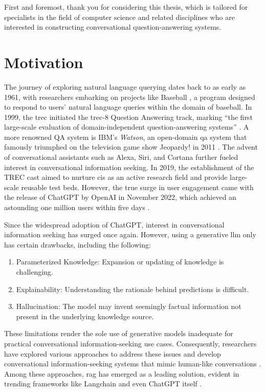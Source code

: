 First and foremost, thank you for considering this thesis, which is tailored for specialists in the field of computer science and related disciplines who are interested in constructing conversational question-answering systems.

\section{Motivation}


The journey of exploring natural language querying dates back to as early as 1961, with researchers embarking on projects like Baseball \cite{green_baseball_1961}, a program designed to respond to users' natural language queries within the domain of baseball. In 1999, the \gls{trec} initiated the \gls{trec}-8 Question Answering track, marking \enquote{the first large-scale evaluation of domain-independent question-answering systems} \cite{voorhees_trec-8_1999}. A more renowned QA system is IBM's \textit{Watson}, an open-domain \gls{qa} system that famously triumphed on the television game show Jeopardy! in 2011 \cite{ferrucci_introduction_2012}. The advent of conversational assistants such as Alexa, Siri, and Cortana further fueled interest in conversational information seeking. In 2019, the establishment of the TREC \gls{cast} aimed to nurture \gls{cis} as an active research field and provide large-scale reusable test beds. However, the true surge in user engagement came with the release of ChatGPT by OpenAI in November 2022, which achieved an astounding one million users within five days \cite{demandsage2022chatgpt}.

Since the widespread adoption of ChatGPT, interest in conversational information seeking has surged once again. However, using a generative \gls{llm} only has certain drawbacks, including the following:

\begin{enumerate}
    \item Parameterized Knowledge: Expansion or updating of knowledge is challenging.
    \item Explainability: Understanding the rationale behind predictions is difficult.
    \item Hallucination: The model may invent seemingly factual information not present in the underlying knowledge source.
\end{enumerate}

These limitations render the sole use of generative models inadequate for practical conversational information-seeking use cases. Consequently, researchers have explored various approaches to address these issues and develop conversational information-seeking systems that mimic human-like conversations \cite{ferrucci_introduction_2012,guu_realm_2020,lewis_retrieval-augmented_2021,nakano_webgpt_2022}. Among these approaches, \gls{rag} \cite{lewis_retrieval-augmented_2021} has emerged as a leading solution, evident in trending frameworks like Langchain \cite{noauthor_question_nodate} and even ChatGPT itself \cite{noauthor_chatgpt_2023}.

